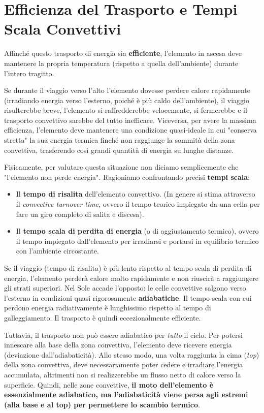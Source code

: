 \section{Efficienza del Trasporto e Tempi Scala Convettivi}

Affinché questo trasporto di energia sia \textbf{efficiente}, l'elemento in ascesa deve mantenere la propria temperatura (rispetto a quella dell'ambiente) durante l'intero tragitto.

Se durante il viaggio verso l'alto l'elemento dovesse perdere calore rapidamente (irradiando energia verso l'esterno, poiché è più caldo dell'ambiente), il viaggio risulterebbe breve, l'elemento si raffredderebbe velocemente, si fermerebbe e il trasporto convettivo sarebbe del tutto inefficace.
Viceversa, per avere la massima efficienza, l'elemento deve mantenere una condizione quasi-ideale in cui "conserva stretta" la sua energia termica finché non raggiunge la sommità della zona convettiva, trasferendo così grandi quantità di energia su lunghe distanze.

Fisicamente, per valutare questa situazione non diciamo semplicemente che "l'elemento non perde energia". Ragioniamo confrontando precisi \textbf{tempi scala}:
\begin{itemize}
\item Il \textbf{tempo di risalita} dell'elemento convettivo. (In genere si stima attraverso il \textit{convective turnover time}, ovvero il tempo teorico impiegato da una cella per fare un giro completo di salita e discesa).
\item Il \textbf{tempo scala di perdita di energia} (o di aggiustamento termico), ovvero il tempo impiegato dall'elemento per irradiarsi e portarsi in equilibrio termico con l'ambiente circostante.
\end{itemize}

Se il viaggio (tempo di risalita) è più lento rispetto al tempo scala di perdita di energia, l'elemento perderà calore molto rapidamente e non riuscirà a raggiungere gli strati superiori.
Nel Sole accade l'opposto: le celle convettive salgono verso l'esterno in condizioni quasi rigorosamente \textbf{adiabatiche}. Il tempo scala con cui perdono energia radiativamente è lunghissimo rispetto al tempo di galleggiamento. Il trasporto è quindi eccezionalmente efficiente.

Tuttavia, il trasporto non può essere adiabatico per \textit{tutto} il ciclo. Per potersi innescare alla base della zona convettiva, l'elemento deve ricevere energia (deviazione dall'adiabaticità). Allo stesso modo, una volta raggiunta la cima (\textit{top}) della zona convettiva, deve necessariamente poter cedere e irradiare l'energia accumulata, altrimenti non si realizzerebbe un flusso netto di calore verso la superficie.
Quindi, nelle zone convettive, \textbf{il moto dell'elemento è essenzialmente adiabatico, ma l'adiabaticità viene persa agli estremi (alla base e al top) per permettere lo scambio termico}.

